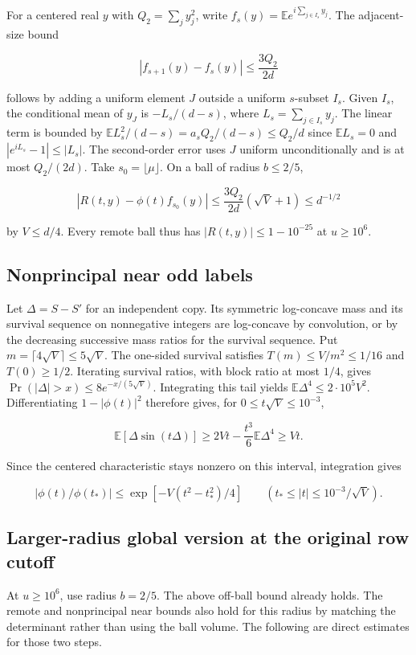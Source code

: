 \documentclass[11pt]{article}
\begin{document}
For a centered real $y$ with $Q_2=\sum_j y_j^2$,
write $f_s(y)=\mathbb E e^{i\sum_{j\in I_s}y_j}$.
The adjacent-size bound

\[
|f_{s+1}(y)-f_s(y)|\le \frac{3Q_2}{2d}
\]

follows by adding a uniform element $J$ outside a uniform
$s$-subset $I_s$. Given $I_s$, the conditional mean of $y_J$
is $-L_s/(d-s)$, where $L_s=\sum_{j\in I_s}y_j$.
The linear term is bounded by
$\mathbb E L_s^2/(d-s)=a_sQ_2/(d-s)\le Q_2/d$ since
$\mathbb E L_s=0$ and $|e^{iL_s}-1|\le |L_s|$.
The second-order error uses $J$ uniform unconditionally and
is at most $Q_2/(2d)$.
Take $s_0=\lfloor\mu\rfloor$. On a ball of radius $b\le2/5$,

\[
|R(t,y)-\phi(t)f_{s_0}(y)|
\le \frac{3Q_2}{2d}(\sqrt V+1)\le d^{-1/2}
\]

by $V\le d/4$. Every remote ball thus has
$|R(t,y)|\le 1-10^{-25}$ at $u\ge10^6$.

\subsection{Nonprincipal near odd labels}

Let $\Delta=S-S'$ for an independent copy. Its symmetric
log-concave mass and its survival sequence on nonnegative
integers are log-concave by convolution, or by the decreasing
successive mass ratios for the survival sequence. Put
$m=\lceil4\sqrt V\rceil\le5\sqrt V$. The one-sided survival
satisfies $T(m)\le V/m^2\le1/16$ and $T(0)\ge1/2$.
Iterating survival ratios, with block ratio at most $1/4$,
gives $\Pr(|\Delta|>x)\le8e^{-x/(5\sqrt V)}$. Integrating
this tail yields $\mathbb E\Delta^4\le2\cdot10^5 V^2$.
Differentiating $1-|\phi(t)|^2$ therefore gives, for
$0\le t\sqrt V\le10^{-3}$,

\[
\mathbb E[\Delta\sin(t\Delta)]
\ge2Vt-\frac{t^3}{6}\mathbb E\Delta^4\ge Vt.
\]

Since the centered characteristic stays nonzero on this
interval, integration gives

\[
|\phi(t)/\phi(t_{\ast})|\le
\exp[-V(t^2-t_{\ast}^2)/4]
\qquad(t_{\ast}\le |t|\le10^{-3}/\sqrt V).
\]

\subsection{Larger-radius global version at the original row cutoff}

At $u\ge10^6$,
use radius $b=2/5$. The above off-ball bound already holds.
The remote and nonprincipal near bounds also hold for this
radius by matching the determinant rather than using the ball
volume. The following are direct estimates for those two steps.
\end{document}
